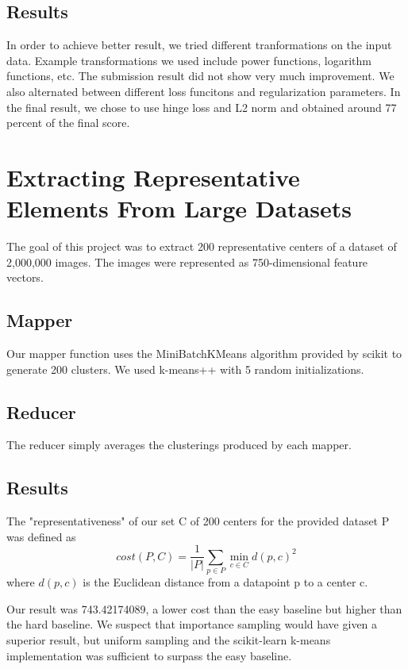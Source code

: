 \documentclass[a4paper, 11pt]{article}
\begin{document}
\subsection{Results}
In order to achieve better result, we tried different tranformations on the input data. Example transformations we used include power functions, logarithm functions, etc. The submission result did not show very much improvement. We also alternated between different loss funcitons and regularization parameters. In the final result, we chose to use hinge loss and L2 norm and obtained around 77 percent of the final score.

\newpage

\section{Extracting Representative Elements From Large Datasets}

The goal of this project was to extract 200 representative centers of a dataset of 2,000,000 images. The images were represented as 750-dimensional feature vectors.

\subsection{Mapper}
Our mapper function uses the MiniBatchKMeans algorithm provided by scikit to generate 200 clusters. We used k-means++ with 5 random initializations.

\subsection{Reducer}
The reducer simply averages the clusterings produced by each mapper.

\subsection{Results}

The "representativeness" of our set C of 200 centers for the provided dataset P was defined as 
\[cost(P,C) = \frac{1}{\mathopen|P\mathclose|} \sum\limits_{p \in P} \min\limits_{c \in C} d(p,c)^2\]
where $d(p,c)$ is the Euclidean distance from a datapoint p to a center c.

Our result was 743.42174089, a lower cost than the easy baseline but higher than the hard baseline. We suspect that importance sampling would have given a superior result, but uniform sampling and the scikit-learn k-means implementation was sufficient to surpass the easy baseline.
\end{document}
